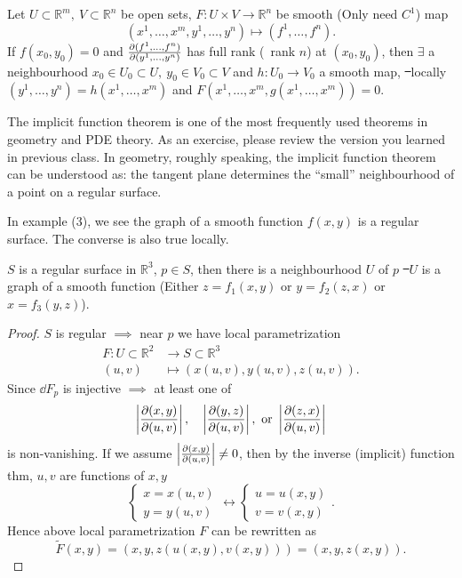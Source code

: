 \begin{theorem}
    Let \(U\subset \mathbb{R}^m,\ V\subset \mathbb{R}^n\) be open sets,
    \(F\colon U\times V\to \mathbb{R}^n\) be smooth (Only need \(C^1\)) map \[
        (x^1,\ldots,x^m,y^1,\ldots,y^n)\mapsto (f^1,\ldots,f^n)
    .\] If \(f(x_0,y_0)=0\) and \(\pdv{(f^1,\ldots,f^n)}{(y^1,\ldots,y^n)}\)
    has full rank (\ie\ rank \(n\)) at \((x_0,y_0)\), then \(\exists\) a
    neighbourhood \(x_0\in U_0\subset U,\ y_0\in V_0\subset V\) and \(h\colon U_0
    \to V_0\) a smooth map, \st\ locally \((y^1,\ldots,y^n)=h(x^1,\ldots,x^m)\) and 
    \(F(x^1,\ldots,x^m,g(x^1,\ldots,x^m))=0\).
\end{theorem}

\begin{remark}
    The implicit function theorem is one of the most frequently used theorems
    in geometry and PDE theory. As an exercise, please review the version you learned
    in previous class. In geometry, roughly speaking, the implicit function theorem
    can be understood as: the tangent plane determines the ``small'' neighbourhood
    of a point on a regular surface.
\end{remark}

In example (3), we see the graph of a smooth function \(f(x,y)\) is a regular
surface. The converse is also true locally.
\begin{prop}
    \(S\) is a regular surface in \(\mathbb{R}^3\), \(p\in S\), then there is a
    neighbourhood \(U\) of \(p\) \st\ \(U\) is a graph of a smooth function
    (Either \(z=f_1(x,y)\) or \(y=f_2(z,x)\) or \(x=f_3(y,z)\)).
\end{prop}
\begin{proof}
    \(S\) is regular \(\implies \) near \(p\) we have local parametrization
    \begin{align*}
        F\colon U\subset \mathbb{R}^2 &\longrightarrow S\subset \mathbb{R}^3 \\
        (u,v) &\longmapsto (x(u,v),y(u,v),z(u,v))
    .\end{align*}
    Since \(\dd{F_p}\) is injective \(\implies \) at least one of \[
        \left|\pdv{(x,y)}{(u,v)}\right|,\quad
        \left|\pdv{(y,z)}{(u,v)}\right|,\ 
        \text{or }\left|\pdv{(z,x)}{(u,v)}\right|
    \] is non-vanishing.
    If we assume \(\left|\pdv{(x,y)}{(u,v)}\right|\neq 0\), then by the inverse
    (implicit) function thm, \(u,v\) are functions of \(x,y\) \ie\ \[
        \begin{cases}
            x=x(u,v) \\
            y=y(u,v)
        \end{cases}\longleftrightarrow
        \begin{cases}
            u=u(x,y) \\
            v=v(x,y)
        \end{cases}
    .\] Hence above local parametrization \(F\) can be rewritten as \[
        \tilde{F}(x,y)=(x,y,z(u(x,y),v(x,y)))=(x,y,z(x,y)).
    \] 
\end{proof}

